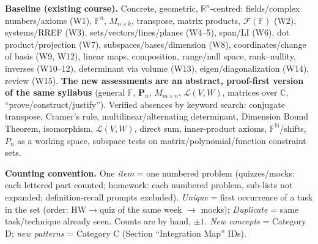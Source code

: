 \textbf{Baseline (existing course).} Concrete, geometric, $\mathbb R^n$-centred: fields/complex numbers/axioms (W1), $\mathbb F^n$, $M_{n\times k}$, transpose, matrix products, $\mathcal F(\mathbb F)$ (W2), systems/RREF (W3), sets/vectors/lines/planes (W4--5), span/LI (W6), dot product/projection (W7), subspaces/bases/dimension (W8), coordinates/change of basis (W9, W12), linear maps, composition, range/null space, rank--nullity, inverses (W10--12), determinant via volume (W13), eigen/diagonalization (W14), review (W15). \textbf{The new assessments are an abstract, proof-first version of the same syllabus} (general $\mathbb F$, $\mathbf P_n$, $M_{m\times n}$, $\mathcal L(V,W)$, matrices over $\mathbb C$, ``prove/construct/justify''). Verified absences by keyword search: conjugate transpose, Cramer's rule, multilinear/alternating determinant, Dimension Bound Theorem, isomorphism, $\mathcal L(V,W)$, direct sum, inner-product axioms, $\mathbb F^{\mathbb N}$/shifts, $P_n$ as a working space, subspace tests on matrix/polynomial/function constraint sets.

\textbf{Counting convention.} One \emph{item} = one numbered problem (quizzes/mocks: each lettered part counted; homework: each numbered problem, sub-lists not expanded; definition-recall prompts excluded). \emph{Unique} = first occurrence of a task in the set (order: HW$\to$quiz of the same week $\to$ mocks); \emph{Duplicate} = same task/technique already seen. Counts are by hand, $\pm1$. \emph{New concepts} = Category D; \emph{new patterns} = Category C (Section ``Integration Map'' IDs).

